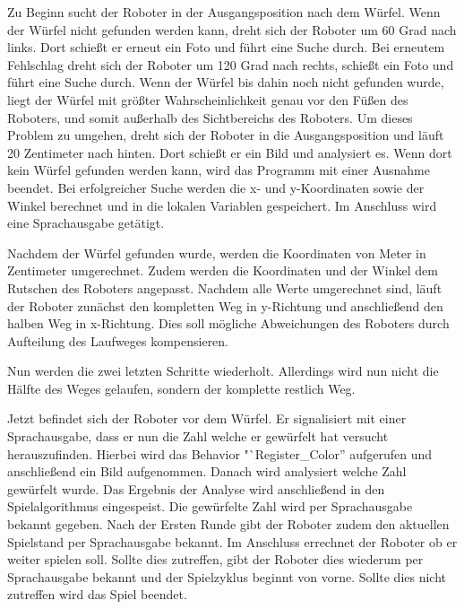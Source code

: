     Zu Beginn sucht der Roboter in der Ausgangsposition nach dem Würfel.
    Wenn der Würfel nicht gefunden werden kann, dreht sich der Roboter um
    60 Grad nach links.
    Dort schießt er erneut ein Foto und führt eine Suche durch.
    Bei erneutem Fehlschlag dreht sich der Roboter um 120 Grad nach rechts,
    schießt ein Foto und führt eine Suche durch.
    Wenn der Würfel bis dahin noch nicht gefunden wurde, liegt der Würfel
    mit größter Wahrscheinlichkeit genau vor den Füßen des Roboters, und somit
    außerhalb des Sichtbereichs des Roboters.
    Um dieses Problem zu umgehen, dreht sich der Roboter in die
    Ausgangsposition und läuft 20 Zentimeter nach hinten.
    Dort schießt er ein Bild und analysiert es.
    Wenn dort kein Würfel gefunden werden kann, wird das Programm
    mit einer Ausnahme beendet.
    Bei erfolgreicher Suche werden die x- und y-Koordinaten sowie der Winkel
    berechnet und in die lokalen Variablen gespeichert.
    Im Anschluss wird eine Sprachausgabe getätigt.

    Nachdem der Würfel gefunden wurde, werden die Koordinaten von
    Meter in Zentimeter umgerechnet.
    Zudem werden die Koordinaten und der Winkel dem Rutschen des Roboters
    angepasst.
    Nachdem alle Werte umgerechnet sind, läuft der
    Roboter zunächst den kompletten Weg in y-Richtung und anschließend den
    halben Weg in x-Richtung.
    Dies soll mögliche Abweichungen des Roboters durch Aufteilung des Laufweges
    kompensieren.

    Nun werden die zwei letzten Schritte wiederholt.
    Allerdings wird nun nicht die Hälfte des Weges gelaufen, sondern der
    komplette restlich Weg.

    Jetzt befindet sich der Roboter vor dem Würfel.
    Er signalisiert mit einer Sprachausgabe, dass er nun die Zahl welche er
    gewürfelt hat versucht herauszufinden.
    Hierbei wird das Behavior "`Register\_Color'' aufgerufen und
    anschließend ein Bild aufgenommen.
    Danach wird analysiert welche Zahl gewürfelt wurde.
    Das Ergebnis der Analyse wird anschließend in den Spielalgorithmus
    eingespeist.
    Die gewürfelte Zahl wird per Sprachausgabe bekannt gegeben.
    Nach der Ersten Runde gibt der Roboter zudem den aktuellen Spielstand per
    Sprachausgabe bekannt.
    Im Anschluss errechnet der Roboter ob er weiter spielen soll.
    Sollte dies zutreffen, gibt der Roboter dies wiederum per Sprachausgabe
    bekannt und der Spielzyklus beginnt von vorne.
    Sollte dies nicht zutreffen wird das Spiel beendet.

